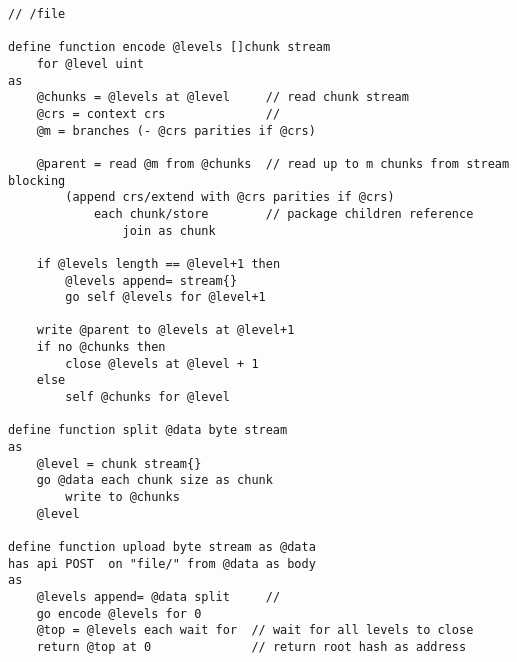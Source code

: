 \begin{definition}\label{def:swarm-hash}
\begin{lstlisting}[language=buzz1]
// /file

define function encode @levels []chunk stream 
    for @level uint
as
    @chunks = @levels at @level     // read chunk stream 
    @crs = context crs              // 
    @m = branches (- @crs parities if @crs) 
    
    @parent = read @m from @chunks  // read up to m chunks from stream blocking
        (append crs/extend with @crs parities if @crs)
            each chunk/store        // package children reference
                join as chunk
                
    if @levels length == @level+1 then
        @levels append= stream{}
        go self @levels for @level+1
    
    write @parent to @levels at @level+1 
    if no @chunks then
        close @levels at @level + 1
    else
        self @chunks for @level
            
define function split @data byte stream 
as
    @level = chunk stream{}
    go @data each chunk size as chunk 
        write to @chunks
    @level

define function upload byte stream as @data
has api POST  on "file/" from @data as body
as
    @levels append= @data split     // 
    go encode @levels for 0
    @top = @levels each wait for  // wait for all levels to close
    return @top at 0              // return root hash as address        
\end{lstlisting}
\end{definition}
                   

